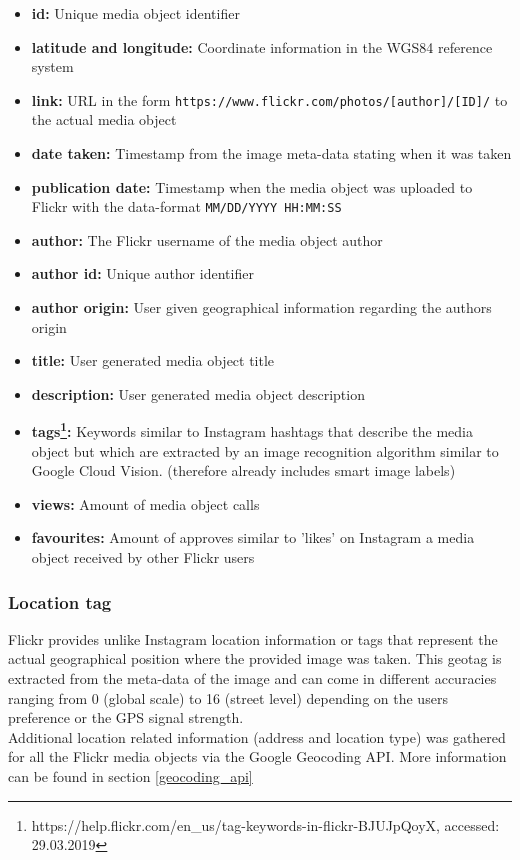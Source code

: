 \begin{itemize}[label={}]
    \item \textbf{id:} Unique media object identifier 
    \item \textbf{latitude and longitude:} Coordinate information in the WGS84 reference system 
    \item \textbf{link:} URL in the form \texttt{https://www.flickr.com/photos/[author]/[ID]/} to the actual media object 
    \item \textbf{date taken:} Timestamp from the image meta-data stating when it was taken 
    \item \textbf{publication date:} Timestamp when the media object was uploaded to Flickr with the data-format \texttt{MM/DD/YYYY HH:MM:SS} 
    \item \textbf{author:} The Flickr username of the media object author 
    \item \textbf{author id:} Unique author identifier  
    \item \textbf{author origin:} User given geographical information regarding the authors origin 
    \item \textbf{title:} User generated media object title 
    \item \textbf{description:} User generated media object description 
    \item \textbf{tags\footnote{https://help.flickr.com/en\_us/tag-keywords-in-flickr-BJUJpQoyX, accessed: 29.03.2019}:} Keywords similar to Instagram hashtags that describe the media object but which are extracted by an image recognition algorithm similar to Google Cloud Vision. (therefore already includes smart image labels) 
    \item \textbf{views:} Amount of media object calls 
    \item \textbf{favourites:} Amount of approves similar to 'likes' on Instagram a media object received by other Flickr users 
\end{itemize}

\subsubsection{Location tag} \label{flickr_location_tag}
Flickr provides unlike Instagram location information or tags that represent the actual geographical position where the provided image was taken. This geotag is extracted from the meta-data of the image and can come in different accuracies ranging from 0 (global scale) to 16 (street level) depending on the users preference or the GPS signal strength. \\
Additional location related information (address and location type) was gathered for all the Flickr media objects via the Google Geocoding API. More information can be found in section \ref{geocoding_api}


